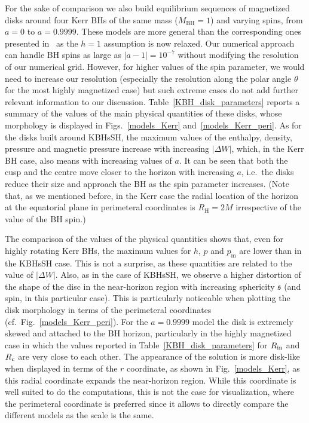 \documentclass[twocolumn,aps,showpacs,showkeys,prd,superscriptaddress,byrevtex, amsmath]{revtex4-1}
\begin{document}
For the sake of comparison we also build equilibrium sequences of magnetized disks around four Kerr BHs of the same mass ($M_{\mathrm{BH}} = 1$) and varying spins, from $a=0$ to $a=0.9999$. These models are more general than the corresponding ones presented in~\cite{Gimeno-Soler:2017} as the $h=1$ assumption is now relaxed. Our numerical approach can handle BH spins as large as $|a-1|=10^{-7}$ without modifying the resolution of our numerical grid. However, for higher values of the spin parameter, we would need to increase our resolution (especially the resolution along the polar angle $\theta$ for the most highly magnetized case) but such extreme cases do not add further relevant information to our discussion. Table~\ref{KBH_disk_parameters} reports a summary of the values of the main physical quantities of these disks, whose morphology is displayed in Figs.~\ref{models_Kerr} and~\ref{models_Kerr_peri}. As for the disks built around KBHsSH, the maximum values of the enthalpy, density, pressure and magnetic pressure increase with increasing $|\Delta W|$, which, in the Kerr BH case, also means with increasing values of $a$. It can be seen that both the cusp and the centre move closer to the horizon with increasing $a$, i.e.~the disks reduce their size and approach the BH as the spin parameter increases. (Note that, as we mentioned before, in the Kerr case the radial location of the horizon at the equatorial plane in perimeteral coordinates is $R_{\mathrm{H}} = 2M$ irrespective of the value of the BH spin.) 

The comparison of the values of the physical quantities shows that, even for highly rotating Kerr BHs, the maximum values for $h$, $p$ and $p_{\mathrm{m}}$ are lower than in the KBHsSH case. This is not a surprise, as these quantities are related to the value of $|\Delta W|$. Also, as in the case of KBHsSH, we observe a higher distortion of the shape of the disc in the near-horizon region with increasing sphericity $\mathfrak{s}$ (and spin, in this particular case). This is particularly noticeable when plotting the disk morphology in terms of the perimeteral coordinates (cf.~Fig.~\ref{models_Kerr_peri}). For the $a=0.9999$ model the disk is extremely skewed and attached to the BH horizon, particularly in the highly magnetized case in which the values reported in Table~\ref{KBH_disk_parameters} for $R_{\rm in}$ and $R_{\rm c}$ are very close to each other. The appearance of the solution is more disk-like when displayed in terms of the $r$ coordinate, as shown in Fig.~\ref{models_Kerr}, as this radial coordinate expands the near-horizon region. While this coordinate is well suited to do the computations, this is not the case for visualization, where the perimeteral coordinate is preferred since it allows to directly compare the different models as the scale is the same.
\end{document}
